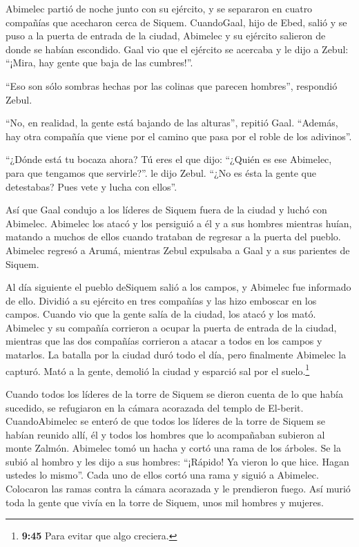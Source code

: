  Abimelec partió de noche junto con su ejército, y se
separaron en cuatro compañías que acecharon cerca de Siquem.
 CuandoGaal, hijo de Ebed, salió y se puso a la puerta de
entrada de la ciudad, Abimelec y su ejército salieron de donde se habían
escondido.  Gaal vio que el ejército se acercaba y le dijo
a Zebul: ``¡Mira, hay gente que baja de las cumbres!''.

``Eso son sólo sombras hechas por las colinas que parecen hombres'',
respondió Zebul.

 ``No, en realidad, la gente está bajando de las alturas'',
repitió Gaal. ``Además, hay otra compañía que viene por el camino que
pasa por el roble de los adivinos''.

 ``¿Dónde está tu bocaza ahora? Tú eres el que dijo:
``¿Quién es ese Abimelec, para que tengamos que servirle?''. le dijo
Zebul. ``¿No es ésta la gente que detestabas? Pues vete y lucha con
ellos''.

 Así que Gaal condujo a los líderes de Siquem fuera de la
ciudad y luchó con Abimelec.  Abimelec los atacó y los
persiguió a él y a sus hombres mientras huían, matando a muchos de ellos
cuando trataban de regresar a la puerta del pueblo. 
Abimelec regresó a Arumá, mientras Zebul expulsaba a Gaal y a sus
parientes de Siquem.

 Al día siguiente el pueblo deSiquem salió a los campos, y
Abimelec fue informado de ello.  Dividió a su ejército en
tres compañías y las hizo emboscar en los campos. Cuando vio que la
gente salía de la ciudad, los atacó y los mató.  Abimelec y
su compañía corrieron a ocupar la puerta de entrada de la ciudad,
mientras que las dos compañías corrieron a atacar a todos en los campos
y matarlos.  La batalla por la ciudad duró todo el día,
pero finalmente Abimelec la capturó. Mató a la gente, demolió la ciudad
y esparció sal por el suelo.\footnote{\textbf{9:45} Para evitar que algo
  creciera.}

 Cuando todos los líderes de la torre de Siquem se dieron
cuenta de lo que había sucedido, se refugiaron en la cámara acorazada
del templo de El-berit.  CuandoAbimelec se enteró de que
todos los líderes de la torre de Siquem se habían reunido allí,
 él y todos los hombres que lo acompañaban subieron al
monte Zalmón. Abimelec tomó un hacha y cortó una rama de los árboles. Se
la subió al hombro y les dijo a sus hombres: ``¡Rápido! Ya vieron lo que
hice. Hagan ustedes lo mismo''.  Cada uno de ellos cortó
una rama y siguió a Abimelec. Colocaron las ramas contra la cámara
acorazada y le prendieron fuego. Así murió toda la gente que vivía en la
torre de Siquem, unos mil hombres y mujeres.

